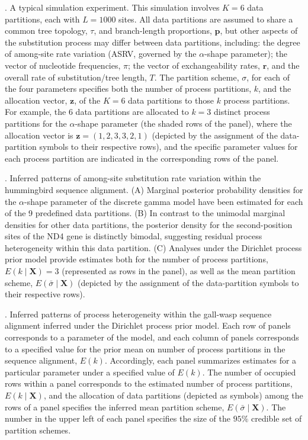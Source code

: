 \documentclass[11pt]{article}
\begin{document}
{\fontsize{10}{10}\selectfont
{}. A typical simulation experiment.  This simulation involves $K = 6$ data partitions, each with $L = 1000$ sites. All data partitions are assumed to share a common tree topology, $\tau$, and branch-length proportions, ${\mathbf p}$, but other aspects of the substitution process may differ between data partitions, including: the degree of among-site rate variation (ASRV, governed by the $\alpha$-shape parameter); the vector of nucleotide frequencies, \mbox{\boldmath$\pi$\unboldmath}; the vector of exchangeability rates, ${\mathbf r}$, and the overall rate of substitution/tree length, $T$.  The partition scheme, $\sigma$, for each of the four parameters specifies both the number of process partitions, $k$, and the allocation vector, ${\mathbf z}$, of the $K = 6$ data partitions to those $k$ process partitions. For example, the 6 data partitions are allocated to $k = 3$ distinct process partitions for the $\alpha$-shape parameter (the shaded rows of the panel), where the allocation vector is ${\mathbf z}  = (1,2,3,3,2,1)$ (depicted by the assignment of the data-partition symbols to their respective rows), and the specific parameter values for each process partition are indicated in the corresponding rows of the panel.

\bigskip

. Inferred patterns of among-site substitution rate variation within the hummingbird sequence alignment.  (A) Marginal posterior probability densities for the $\alpha$-shape parameter of the discrete gamma model have been estimated for each of the 9 predefined data partitions.  (B) In contrast to the unimodal marginal densities for other data partitions, the posterior density for the second-position sites of the ND4 gene is distinctly bimodal, suggesting residual process heterogeneity within this data partition.  (C) Analyses under the Dirichlet process prior model provide estimates both for the number of process partitions, $E(k \mid \mathbf{X}) = 3$ (represented as rows in the panel), as well as the mean partition scheme, $E(\bar{\sigma} \mid \mathbf{X})$ (depicted by the assignment of the data-partition symbols to their respective rows).

\bigskip

. Inferred patterns of process heterogeneity within the gall-wasp sequence alignment inferred under the Dirichlet process prior model.  Each row of panels corresponds to a parameter of the model, and each column of panels corresponds to a specified value for the prior mean on number of process partitions in the sequence alignment, $E(k)$.  Accordingly, each panel summarizes estimates for a particular parameter under a specified value of $E(k)$.  The number of occupied rows within a panel corresponds to the estimated number of process partitions, $E(k \mid \mathbf{X})$, and the allocation of data partitions (depicted as symbols) among the rows of a panel specifies the inferred mean partition scheme, $E(\bar{\sigma} \mid \mathbf{X})$.  The number in the upper left of each panel specifies the size of the $95\%$ credible set of partition schemes.  

}
\end{document}
